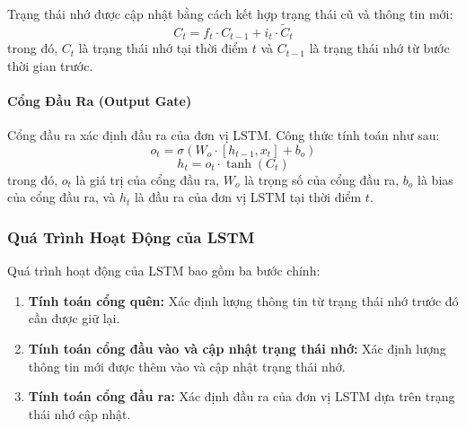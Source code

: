 Trạng thái nhớ được cập nhật bằng cách kết hợp trạng thái cũ và thông tin mới:
\[
C_t = f_t \cdot C_{t-1} + i_t \cdot \tilde{C}_t
\]
trong đó, $C_t$ là trạng thái nhớ tại thời điểm $t$ và $C_{t-1}$ là trạng thái nhớ từ bước thời gian trước.

\paragraph{Cổng Đầu Ra (Output Gate)}

Cổng đầu ra xác định đầu ra của đơn vị LSTM. Công thức tính toán như sau:
\[
o_t = \sigma(W_o \cdot [h_{t-1}, x_t] + b_o)
\]
\[
h_t = o_t \cdot \tanh(C_t)
\]
trong đó, $o_t$ là giá trị của cổng đầu ra, $W_o$ là trọng số của cổng đầu ra, $b_o$ là bias của cổng đầu ra, và $h_t$ là đầu ra của đơn vị LSTM tại thời điểm $t$.

\subsubsection{Quá Trình Hoạt Động của LSTM}

Quá trình hoạt động của LSTM bao gồm ba bước chính:

\begin{enumerate}
    \item \textbf{Tính toán cổng quên:} Xác định lượng thông tin từ trạng thái nhớ trước đó cần được giữ lại.
    \item \textbf{Tính toán cổng đầu vào và cập nhật trạng thái nhớ:} Xác định lượng thông tin mới được thêm vào và cập nhật trạng thái nhớ.
    \item \textbf{Tính toán cổng đầu ra:} Xác định đầu ra của đơn vị LSTM dựa trên trạng thái nhớ cập nhật.
\end{enumerate}